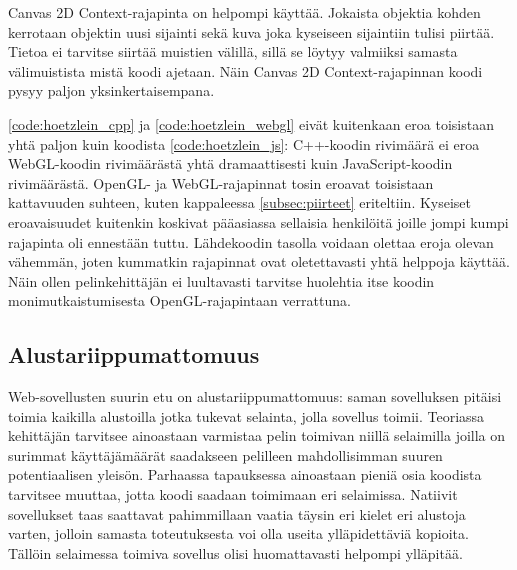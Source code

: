 Canvas 2D Context-rajapinta on helpompi käyttää. Jokaista objektia kohden kerrotaan objektin uusi sijainti sekä kuva joka kyseiseen sijaintiin tulisi piirtää. Tietoa ei tarvitse siirtää muistien välillä, sillä se löytyy valmiiksi samasta välimuistista mistä koodi ajetaan. Näin Canvas 2D Context-rajapinnan koodi pysyy paljon yksinkertaisempana.

\autoref{code:hoetzlein_cpp} ja \autoref{code:hoetzlein_webgl} eivät kuitenkaan eroa toisistaan yhtä paljon kuin koodista \ref{code:hoetzlein_js}: C++-koodin rivimäärä ei eroa WebGL-koodin rivimäärästä yhtä dramaattisesti kuin JavaScript-koodin rivimäärästä. OpenGL- ja WebGL-rajapinnat tosin eroavat toisistaan kattavuuden suhteen, kuten kappaleessa \ref{subsec:piirteet} eriteltiin. Kyseiset eroavaisuudet kuitenkin koskivat pääasiassa sellaisia henkilöitä joille jompi kumpi rajapinta oli ennestään tuttu. Lähdekoodin tasolla voidaan olettaa eroja olevan vähemmän, joten kummatkin rajapinnat ovat oletettavasti yhtä helppoja käyttää. Näin ollen pelinkehittäjän ei luultavasti tarvitse huolehtia itse koodin monimutkaistumisesta OpenGL-rajapintaan verrattuna. 





\subsection{Alustariippumattomuus}

Web-sovellusten suurin etu on alustariippumattomuus: saman sovelluksen pitäisi toimia kaikilla alustoilla jotka tukevat selainta, jolla sovellus toimii. Teoriassa kehittäjän tarvitsee ainoastaan varmistaa pelin toimivan niillä selaimilla joilla on surimmat käyttäjämäärät saadakseen pelilleen mahdollisimman suuren potentiaalisen yleisön. Parhaassa tapauksessa ainoastaan pieniä osia koodista tarvitsee muuttaa, jotta koodi saadaan toimimaan eri selaimissa. Natiivit sovellukset taas saattavat pahimmillaan vaatia täysin eri kielet eri alustoja varten, jolloin samasta toteutuksesta voi olla useita ylläpidettäviä kopioita. Tällöin selaimessa toimiva sovellus olisi huomattavasti helpompi ylläpitää.

